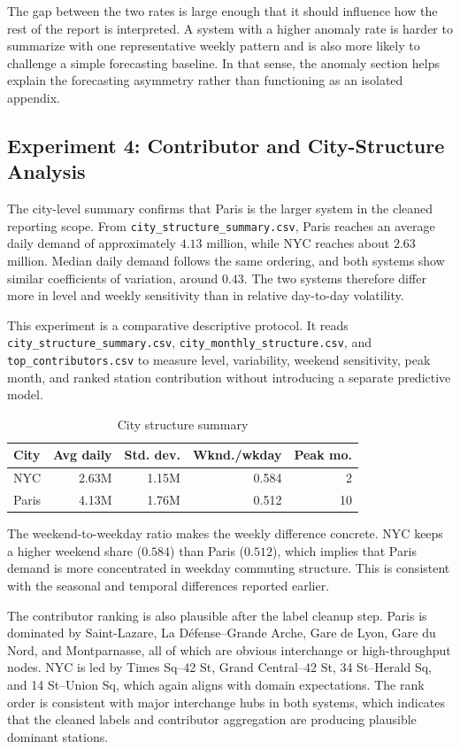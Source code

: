 \documentclass[10pt,twocolumn,a4paper]{article}
\begin{document}
The gap between the two rates is large enough that it should influence how the
rest of the report is interpreted. A system with a higher anomaly rate is
harder to summarize with one representative weekly pattern and is also more
likely to challenge a simple forecasting baseline. In that sense, the anomaly
section helps explain the forecasting asymmetry rather than functioning as an
isolated appendix.

\subsection{Experiment 4: Contributor and City-Structure Analysis}

The city-level summary confirms that Paris is the larger system in the cleaned
reporting scope. From \nolinkurl{city_structure_summary.csv}, Paris reaches an
average daily demand of approximately \(4.13\) million, while NYC reaches about
\(2.63\) million. Median daily demand follows the same ordering, and both
systems show similar coefficients of variation, around \(0.43\). The two
systems therefore differ more in level and weekly sensitivity than in relative
day-to-day volatility.

This experiment is a comparative descriptive protocol. It reads
\nolinkurl{city_structure_summary.csv},
\nolinkurl{city_monthly_structure.csv}, and \nolinkurl{top_contributors.csv} to
measure level, variability, weekend sensitivity, peak month, and ranked station
contribution without introducing a separate predictive model.

\begin{table}[t]
\centering
\footnotesize
\caption{City structure summary}
\begin{tabular}{@{}lrrrr@{}}
\toprule
City & Avg daily & Std. dev. & Wknd./wkday & Peak mo. \\
\midrule
NYC & 2.63M & 1.15M & 0.584 & 2 \\
Paris & 4.13M & 1.76M & 0.512 & 10 \\
\bottomrule
\end{tabular}
\end{table}

The weekend-to-weekday ratio makes the weekly difference concrete. NYC keeps a
higher weekend share (\(0.584\)) than Paris (\(0.512\)), which implies that
Paris demand is more concentrated in weekday commuting structure. This is
consistent with the seasonal and temporal differences reported earlier.

The contributor ranking is also plausible after the label cleanup step.
Paris is dominated by Saint-Lazare, La Défense--Grande Arche, Gare de Lyon,
Gare du Nord, and Montparnasse, all of which are obvious interchange or
high-throughput nodes. NYC is led by Times Sq--42 St, Grand Central--42 St,
34 St--Herald Sq, and 14 St--Union Sq, which again aligns with domain
expectations. The rank order is consistent with major interchange hubs in both
systems, which indicates that the cleaned labels and contributor aggregation
are producing plausible dominant stations.
\end{document}
